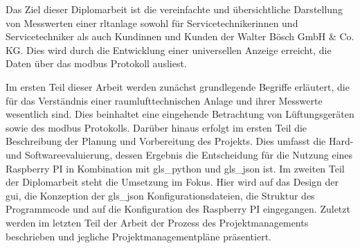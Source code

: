 Das Ziel dieser Diplomarbeit ist die vereinfachte und übersichtliche Darstellung von Messwerten einer \acf{rltanlage} sowohl für Servicetechnikerinnen und Servicetechniker als auch Kundinnen und Kunden der Walter Bösch GmbH \& Co. KG. Dies wird durch die Entwicklung einer universellen Anzeige erreicht, die Daten über das \gls{modbus} Protokoll ausliest. 

Im ersten Teil dieser Arbeit werden zunächst grundlegende Begriffe erläutert, die für das Verständnis einer raumlufttechnischen Anlage und ihrer Messwerte wesentlich sind. Dies beinhaltet eine eingehende Betrachtung von Lüftungsgeräten sowie des \gls{modbus} Protokolls. Darüber hinaus erfolgt im ersten Teil die Beschreibung der Planung und Vorbereitung des Projekts. Dies umfasst die Hard- und Softwareevaluierung, dessen Ergebnis die Entscheidung für die Nutzung eines Raspberry PI in Kombination mit \gls{gls_python} und \gls{gls_json} ist. 
\newline Im zweiten Teil der Diplomarbeit steht die Umsetzung im Fokus. Hier wird auf das Design der \acf{gui}, die Konzeption der \gls{gls_json} Konfigurationsdateien, die Struktur des Programmcode und auf die Konfiguration des Raspberry PI eingegangen. 
\newline Zuletzt werden im letzten Teil der Arbeit der Prozess des Projektmanagements beschrieben und jegliche Projektmanagementpläne präsentiert.
















